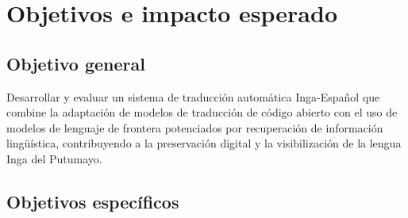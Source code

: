 \documentclass[12pt,a4paper]{article}
\begin{document}
\section{Objetivos e impacto esperado}

\subsection{Objetivo general}

Desarrollar y evaluar un sistema de traducción automática Inga-Español que combine la adaptación de modelos de traducción de código abierto con el uso de modelos de lenguaje de frontera potenciados por recuperación de información lingüística, contribuyendo a la preservación digital y la visibilización de la lengua Inga del Putumayo.

\subsection{Objetivos específicos}
\end{document}
